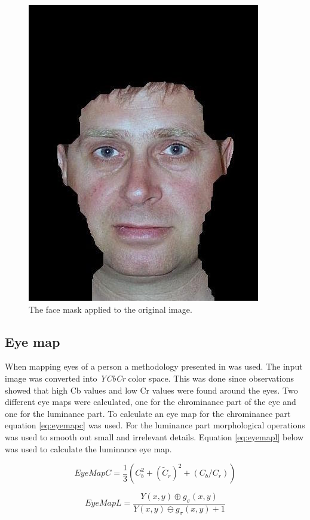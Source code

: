 \begin{figure}[htbp]
  \centering
  \includegraphics[width=0.6\columnwidth]{images/skinmask.jpg}
  \caption{The face mask applied to the original image.}
  \label{fig:skinmask}
\end{figure}

\subsection{Eye map}
When mapping eyes of a person a methodology presented in \cite{facedetection}
was used. The input image was converted into \emph{YCbCr} color space. This
was done since observations showed that high Cb values and low Cr values were
found around the eyes. Two different eye maps were calculated, one for the
chrominance part of the eye and one for the luminance part. To calculate an
eye map for the chrominance part equation \ref{eq:eyemapc} was used. For the
luminance part morphological operations was used to smooth out small and
irrelevant details. Equation \ref{eq:eyemapl} below was used to calculate the
luminance eye map.

\begin{equation}
  EyeMapC = \frac{1}{3}(C_b^2 + (\widetilde{C}_r)^2 + (C_b/C_r))
  \label{eq:eyemapc}
\end{equation}

\begin{equation}
  EyeMapL = \frac{Y(x, y)\oplus g_\sigma (x,y)}{Y(x, y)\ominus g_\sigma (x,y) + 1}
  \label{eq:eyemapl}
\end{equation}

